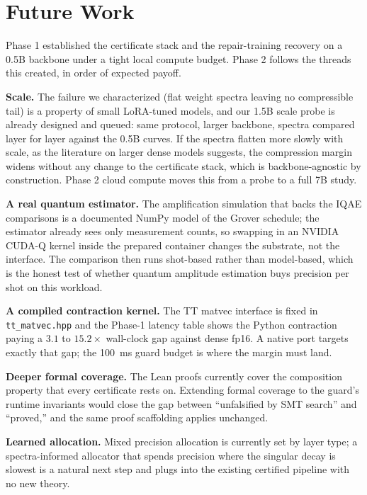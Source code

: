 \documentclass[conference,10pt]{IEEEtran}
\begin{document}
\section{Future Work}

Phase 1 established the certificate stack and the repair-training recovery
on a 0.5B backbone under a tight local compute budget. Phase 2 follows the
threads this created, in order of expected payoff.

\textbf{Scale.} The failure we characterized (flat weight spectra leaving
no compressible tail) is a property of small LoRA-tuned models, and our
1.5B scale probe is already designed and queued: same protocol, larger
backbone, spectra compared layer for layer against the 0.5B curves. If the
spectra flatten more slowly with scale, as the literature on larger
dense models suggests, the compression margin widens without any change
to the certificate stack, which is backbone-agnostic by construction.
Phase 2 cloud compute moves this from a probe to a full 7B study.

\textbf{A real quantum estimator.} The amplification simulation that
backs the IQAE comparisons is a documented NumPy model of the Grover
schedule; the estimator already sees only measurement counts, so swapping
in an NVIDIA CUDA-Q kernel inside the prepared container changes the
substrate, not the interface. The comparison then runs shot-based rather
than model-based, which is the honest test of whether quantum amplitude
estimation buys precision per shot on this workload.

\textbf{A compiled contraction kernel.} The TT matvec interface is fixed
in \texttt{tt\_matvec.hpp} and the Phase-1 latency table shows the Python
contraction paying a $3.1$ to $15.2\times$ wall-clock gap against dense
fp16. A native port targets exactly that gap; the 100~ms guard budget is
where the margin must land.

\textbf{Deeper formal coverage.} The Lean proofs currently cover the
composition property that every certificate rests on. Extending formal
coverage to the guard's runtime invariants would close the gap between
``unfalsified by SMT search'' and ``proved,'' and the same proof
scaffolding applies unchanged.

\textbf{Learned allocation.} Mixed precision allocation is currently set
by layer type; a spectra-informed allocator that spends precision where
the singular decay is slowest is a natural next step and plugs into the
existing certified pipeline with no new theory.
\end{document}
